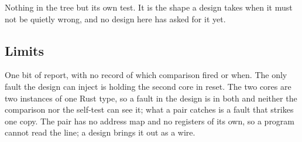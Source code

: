 Nothing in the tree but its own test. It is the shape a design takes
when it must not be quietly wrong, and no design here has asked for it
yet.

\subsection*{Limits}

One bit of report, with no record of which comparison fired or when.
The only fault the design can inject is holding the second core in
reset. The two cores are two instances of one Rust type, so a fault in
the design is in both and neither the comparison nor the self-test can
see it; what a pair catches is a fault that strikes one copy. The pair
has no address map and no registers of its own, so a program cannot
read the line; a design brings it out as a wire.
